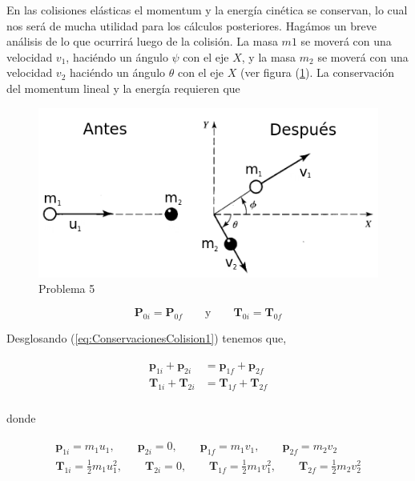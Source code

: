 \documentclass[a4paper,10pt]{article}
\begin{document}
En las colisiones elásticas el momentum y la energía cinética se conservan, lo cual nos 
será de mucha utilidad para los cálculos posteriores. Hagámos un breve análisis de lo 
que ocurrirá luego de la colisión. La masa $m1$ se moverá con una velocidad $v_1$,
haciéndo un ángulo $\psi$ con el eje $X$, y la masa $m_2$ se moverá con una 
velocidad $v_2$ haciéndo un ángulo $\theta$ con el eje $X$ (ver figura (\ref{fig:problema5}). La conservación 
del momentum lineal y la energía requieren que 

\begin{figure}[ht]
 \centering
\includegraphics[scale=0.5]{problema5fig1}
\caption{Problema 5}
\label{fig:problema5}
\end{figure}


\begin{equation}
 \mathbf{P}_{0i} = \mathbf{P}_{0f} \qquad \text{y} \qquad \mathbf{T}_{0i} = \mathbf{T}_{0f}
 \label{eq:ConservacionesColision1}
\end{equation}

Desglosando (\ref{eq:ConservacionesColision1}) tenemos que,

\begin{gather}
 \begin{split}
  \mathbf{p}_{1i} +  \mathbf{p}_{2i} &=   \mathbf{p}_{1f} +  \mathbf{p}_{2f} \\
  \mathbf{T}_{1i} +  \mathbf{T}_{2i} &=   \mathbf{T}_{1f} +  \mathbf{T}_{2f} \\
 \label{eq:ConservacionesColision2}
 \end{split}
\end{gather}

donde

\begin{gather*}
 \begin{split}
%
\mathbf{p}_{1i} = m_1 u_1, \qquad \mathbf{p}_{2i} = 0, \qquad \mathbf{p}_{1f} = m_1 v_1, \qquad \mathbf{p}_{2f} = m_2 v_2 \\
%
\mathbf{T}_{1i} = \frac{1}{2} m_1 u_1^2, \qquad \mathbf{T}_{2i} = 0, \qquad \mathbf{T}_{1f} = \frac{1}{2} m_1 v_1^2, \qquad \mathbf{T}_{2f} = \frac{1}{2} m_2 v_2^2 \\
%
 \end{split}
\end{gather*}
\end{document}
